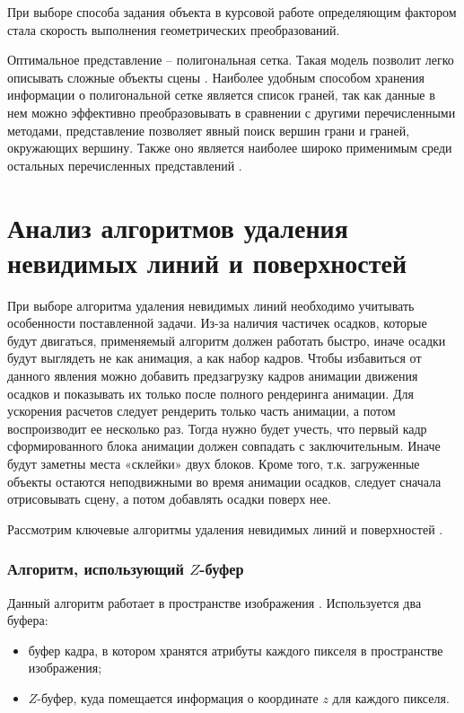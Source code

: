 При выборе способа задания объекта в курсовой работе определяющим фактором стала скорость выполнения геометрических преобразований.

Оптимальное представление -- полигональная сетка. Такая модель позволит легко описывать сложные объекты сцены \cite{polygonal}. Наиболее удобным способом хранения информации о полигональной сетке является список граней, так как данные в нем можно эффективно преобразовывать в сравнении с другими перечисленными методами, представление позволяет явный поиск вершин грани и граней, окружающих вершину. Также оно является наиболее широко
применимым среди остальных перечисленных представлений \cite{list_faces}.

\section{Анализ алгоритмов удаления невидимых линий и поверхностей}

При выборе алгоритма удаления невидимых линий необходимо учитывать особенности поставленной задачи. Из-за наличия частичек осадков, которые будут двигаться, применяемый алгоритм должен работать быстро, иначе осадки будут выглядеть не как анимация, а как набор кадров. Чтобы избавиться от данного явления можно добавить предзагрузку
кадров анимации движения осадков и показывать их только после полного
рендеринга анимации. Для ускорения расчетов следует рендерить
только часть анимации, а потом воспроизводит ее несколько раз. Тогда нужно будет учесть, что первый кадр сформированного блока анимации должен совпадать с заключительным.
Иначе будут заметны места «склейки» двух блоков. Кроме того, т.к. загруженные объекты остаются неподвижными во время анимации осадков, следует сначала отрисовывать сцену, а потом добавлять осадки поверх нее.

Рассмотрим ключевые алгоритмы удаления невидимых линий и поверхностей \cite{rogers}.

\subsubsection{Алгоритм, использующий $Z$-буфер}

Данный алгоритм работает в пространстве изображения \cite{rogers}. Используется два буфера:
\begin{itemize}
	\item буфер кадра, в котором хранятся атрибуты каждого пикселя в пространстве изображения;
	\item $Z$-буфер, куда помещается информация о координате $z$ для каждого пикселя.
\end{itemize}

